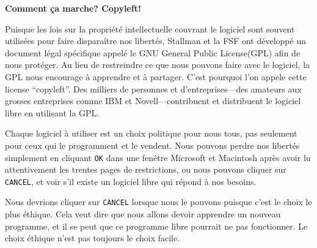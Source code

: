 \documentclass[12pt]{article}
\begin{document}

\begin{center}
{\Large\bf Comment ça marche? Copyleft!}
\end{center}

Puisque les lois sur la propriété intellectuelle couvrant le logiciel sont
souvent utilisées pour faire disparaître nos libertés, Stallman et la FSF ont
développé un document légal spécifique appelé le GNU General Public
License(GPL) afin de nous protéger. Au lieu de restreindre ce que nous pouvons
faire avec le logiciel, la GPL nous encourage à apprendre et à partager. C'est
pourquoi l'on appele cette license ``copyleft''. Des milliers de personnes et
d'entreprises---des amateurs aux grosses entreprises comme IBM et
Novell---contribuent et distribuent le logiciel libre en utilisant la GPL.


Chaque logiciel à utiliser est un choix politique pour nous tous, pas seulement
pour ceux qui le programment et le vendent. Nous pouvons perdre nos libertés
simplement en cliquant {\tt OK} dans une fenêtre Microsoft et Macintosh après
avoir lu attentivement les trentes pages de restrictions, ou nous pouvons
cliquer sur {\tt CANCEL}, et voir s'il existe un logiciel libre qui répond à
nos besoins.


Nous devrions cliquer sur {\tt CANCEL} lorsque nous le pouvons puisque c'est le
choix le plus éthique. Cela veut dire que nous allons devoir apprendre un
nouveau programme, et il se peut que ce programme libre pourrait ne pas
fonctionner. Le choix éthique n'est pas toujours le choix facile.
\end{document}
